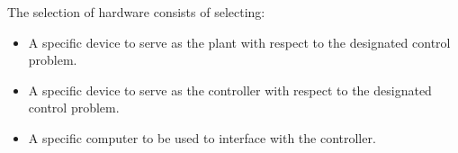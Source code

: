 \documentclass[crop=false,float=true,class=scrreprt]{standalone}
\begin{document}
The selection of hardware consists of selecting:

\vspace*{-1em}
\begin{itemize}[leftmargin=*, itemsep=-1em]

\item A specific device to serve as the plant with respect to the designated control problem.\\

\item A specific device to serve as the controller with respect to the designated control problem.\\

\item A specific computer to be used to interface with the controller.\\

\end{itemize}
\vspace*{+1em}




\clearpage
\end{document}
